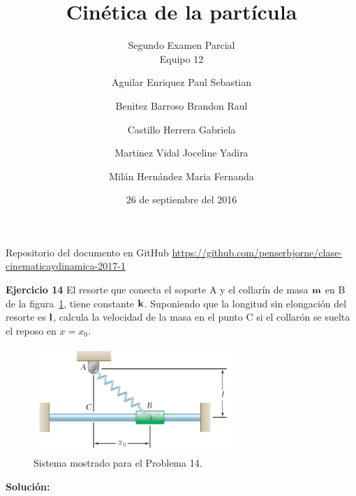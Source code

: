 \documentclass[a4paper,11pt]{scrartcl}
\title{Cinética de la partícula}
\subtitle{Segundo Examen Parcial \\ Equipo 12}
\author{
  Aguilar Enriquez Paul Sebastian\\
  \and
  Benitez Barroso Brandon Raul\\
  \and
  Castillo Herrera Gabriela\\
  \and
  Martinez Vidal Joceline Yadira\\
  \and
  Milán Hernández Maria Fernanda
  }
\date{26 de septiembre del 2016}
\begin{document}
\maketitle

\begin{center}
  Repositorio del documento en GitHub
  \url{https://github.com/penserbjorne/clase-cinematicaydinamica-2017-1}
\end{center}

\textbf{Ejercicio 14} El resorte que conecta el soporte A y el collarín de masa ${\bf m}$  en B de la figura~\ref{fig:14_1}, tiene constante  ${\bf k}$. Suponiendo que la longitud sin elongación del resorte es  ${\bf l}$, calcula la velocidad de la masa en el punto C si el collarón se suelta el reposo en $x = x_{0} $.\\

\begin{figure}[H]
  \centering
  \includegraphics[height=4cm]{14_1}
  \caption{Sistema mostrado para el Problema 14.}
  \label{fig:14_1}
\end{figure}

\textbf{Solución:}
\end{document}
